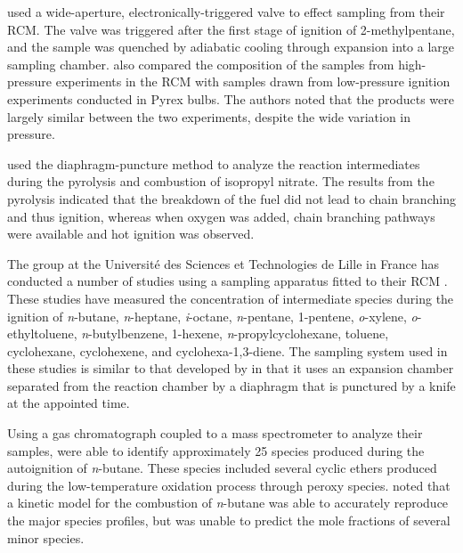 \documentclass[../main.tex]{subfiles}
\begin{document}
\textcite{Affleck1967} used a wide-aperture, electronically-triggered valve
to effect sampling from their RCM. The valve was triggered after the first
stage of ignition of 2-methylpentane, and the sample was quenched by
adiabatic cooling through expansion into a large sampling chamber.
\textcite{Affleck1967} also compared the composition of the samples from
high-pressure experiments in the RCM with samples drawn from low-pressure
ignition experiments conducted in Pyrex bulbs. The authors noted that
the products were largely similar between the two experiments, despite the
wide variation in pressure.

\textcite{Beeley1980} used the diaphragm-puncture method to analyze the
reaction intermediates during the pyrolysis and combustion of isopropyl
nitrate. The results from the pyrolysis indicated that the breakdown
of the fuel did not lead to chain branching and thus ignition, whereas
when oxygen was added, chain branching pathways were available and hot
ignition was observed.

The group at the Université des Sciences et Technologies de Lille in France
has conducted a number of studies using a sampling apparatus fitted to
their RCM \cite{Minetti1994, Minetti1995, Minetti1996, Ribaucour1998,
Minetti1999, Ribaucour2000a, Roubaud2000a, Lemaire2001, Ribaucour2002,
Vanhove2006a, Vanhove2006, Crochet2010}. These studies have measured the
concentration of intermediate species during the ignition of \textit{n}-butane,
\textit{n}-heptane, \textit{i}-octane, \textit{n}-pentane, 1-pentene,
\textit{o}-xylene, \textit{o}-ethyltoluene, \textit{n}-butylbenzene,
1-hexene, \textit{n}-propylcyclohexane, toluene, cyclohexane, cyclohexene,
and cyclohexa-1,3-diene. The sampling system used in these studies
is similar to that developed by \textcite{Roblee1961} in that it uses an
expansion chamber separated from the reaction chamber by a diaphragm
that is punctured by a knife at the appointed time.

Using a gas chromatograph coupled to a mass spectrometer to analyze their
samples, \textcite{Minetti1994} were able to identify approximately 25
species produced during the autoignition of \textit{n}-butane. These
species included several cyclic ethers produced during the low-temperature
oxidation process through peroxy species. \textcite{Minetti1994} noted
that a kinetic model for the combustion of \textit{n}-butane was able
to accurately reproduce the major species profiles, but was unable to
predict the mole fractions of several minor species.
\end{document}
